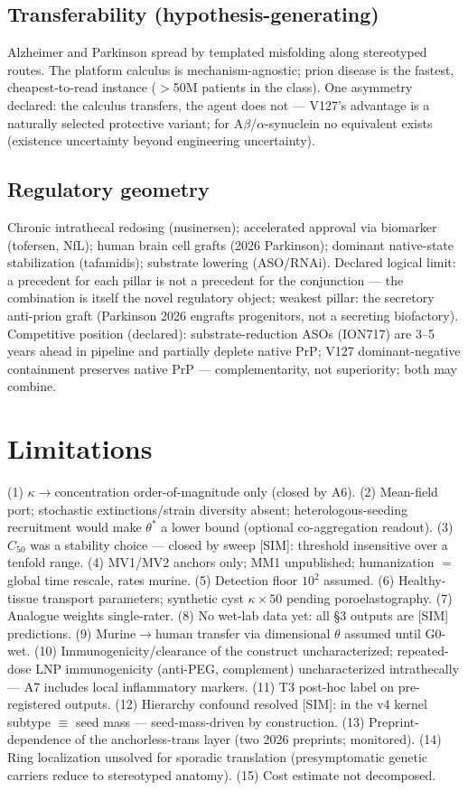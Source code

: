 \documentclass[10pt,twocolumn]{article}
\begin{document}
\subsection{Transferability (hypothesis-generating)}
Alzheimer and Parkinson spread by templated misfolding along stereotyped routes. The platform calculus is mechanism-agnostic; prion disease is the fastest, cheapest-to-read instance ($>$50M patients in the class). One asymmetry declared: the calculus transfers, the agent does not --- V127's advantage is a naturally selected protective variant; for A$\beta$/$\alpha$-synuclein no equivalent exists (existence uncertainty beyond engineering uncertainty).

\subsection{Regulatory geometry}
Chronic intrathecal redosing (nusinersen); accelerated approval via biomarker (tofersen, NfL); human brain cell grafts (2026 Parkinson); dominant native-state stabilization (tafamidis); substrate lowering (ASO/RNAi). Declared logical limit: a precedent for each pillar is not a precedent for the conjunction --- the combination is itself the novel regulatory object; weakest pillar: the secretory anti-prion graft (Parkinson 2026 engrafts progenitors, not a secreting biofactory). Competitive position (declared): substrate-reduction ASOs (ION717) are 3--5 years ahead in pipeline and partially deplete native PrP; V127 dominant-negative containment preserves native PrP --- complementarity, not superiority; both may combine.

\section{Limitations}
(1) $\kappa\to$concentration order-of-magnitude only (closed by A6). (2) Mean-field port; stochastic extinctions/strain diversity absent; heterologous-seeding recruitment would make $\theta^{*}$ a lower bound (optional co-aggregation readout). (3) $C_{50}$ was a stability choice --- closed by sweep [SIM]: threshold insensitive over a tenfold range. (4) MV1/MV2 anchors only; MM1 unpublished; humanization $=$ global time rescale, rates murine. (5) Detection floor $10^2$ assumed. (6) Healthy-tissue transport parameters; synthetic cyst $\kappa\times50$ pending poroelastography. (7) Analogue weights single-rater. (8) No wet-lab data yet: all \S3 outputs are [SIM] predictions. (9) Murine$\to$human transfer via dimensional $\theta$ assumed until G0-wet. (10) Immunogenicity/clearance of the construct uncharacterized; repeated-dose LNP immunogenicity (anti-PEG, complement) uncharacterized intrathecally --- A7 includes local inflammatory markers. (11) T3 post-hoc label on pre-registered outputs. (12) Hierarchy confound resolved [SIM]: in the v4 kernel subtype $\equiv$ seed mass --- seed-mass-driven by construction. (13) Preprint-dependence of the anchorless-trans layer (two 2026 preprints; monitored). (14) Ring localization unsolved for sporadic translation (presymptomatic genetic carriers reduce to stereotyped anatomy). (15) Cost estimate not decomposed.
\end{document}
